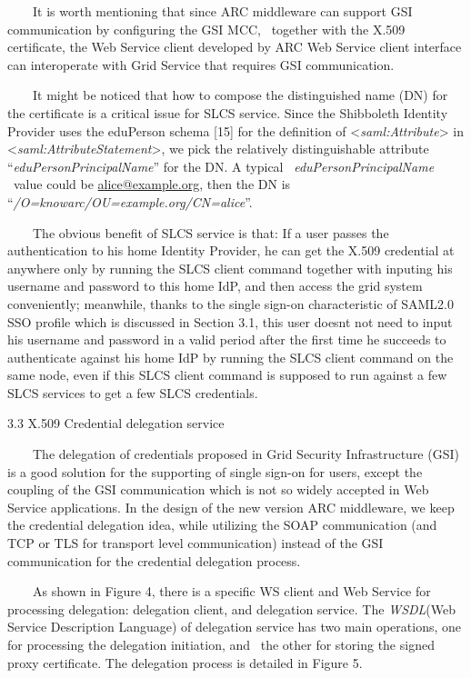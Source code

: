 \documentclass{article}
\begin{document}
\ \ \ \ It is worth mentioning that since ARC middleware can support GSI
communication by configuring the GSI MCC, \ together with the X.509
certificate, the Web Service client developed by ARC Web Service client
interface can interoperate with Grid Service that requires GSI
communication.

\ \ \ \ It might be noticed that how to compose the distinguished name
(DN) for the certificate is a critical issue for SLCS service. Since
the Shibboleth Identity Provider uses the eduPerson schema [15] for the
definition of {\textless}\textit{saml:Attribute}{\textgreater} in
{\textless}\textit{saml:AttributeStatement}{\textgreater}, we pick the
relatively distinguishable attribute
{\textquotedblleft}\textit{eduPersonPrincipalName}{\textquotedblright}
for the DN. A typical \ \textit{eduPersonPrincipalName} \ value could
be \href{mailto:alice@example.org}{alice@example.org}, then the DN is
{\textquotedblleft}\textit{/O=knowarc/OU=example.org/CN=alice}{\textquotedblright}.

\ \ \ \ The obvious benefit of SLCS service is that: If a user passes
the authentication to his home Identity Provider, he can get the X.509
credential at anywhere only by running the SLCS client command together
with inputing his username and password to this home IdP, and then
access the grid system conveniently; meanwhile, thanks to the single
sign-on characteristic of SAML2.0 SSO profile which is discussed in
Section 3.1, this user doesn{\textquotesingle}t not need to input his
username and password in a valid period after the first time he
succeeds to authenticate against his home IdP by running the SLCS
client command on the same node, even if this SLCS client command is
supposed to run against a few SLCS services to get a few SLCS
credentials.


\bigskip

3.3 X.509 Credential delegation service

\ \ \ \ The delegation of credentials proposed in Grid Security
Infrastructure (GSI) is a good solution for the supporting of single
sign-on for users, except the coupling of the GSI communication which
is not so widely accepted in Web Service applications. In the design of
the new version ARC middleware, we keep the credential delegation idea,
while utilizing the SOAP communication (and TCP or TLS for transport
level communication) instead of the GSI communication for the
credential delegation process.

\ \ \ \ As shown in Figure 4, there is a specific WS client and Web
Service for processing delegation: delegation client, and delegation
service. The \textit{WSDL}(Web Service Description Language) of
delegation service has two main operations, one for processing the
delegation initiation, and \ the other for storing the signed proxy
certificate. The delegation process is detailed in Figure 5. 
\end{document}
